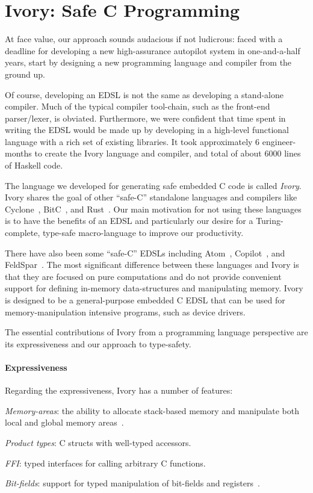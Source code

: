 \section{Ivory: Safe C Programming}
\label{sec:ivory}

At face value, our approach sounds audacious if not ludicrous: faced with a
deadline for developing a new high-assurance autopilot system in one-and-a-half
years, start by designing a new programming language and compiler from the
ground up.

Of course, developing an EDSL is not the same as developing a stand-alone
compiler.  Much of the typical compiler tool-chain, such as the front-end
parser/lexer, is obviated.  Furthermore, we were confident that time spent in
writing the EDSL would be made up by developing in a high-level functional
language with a rich set of existing libraries. It took approximately 6
engineer-months to create the Ivory language and compiler, and total of about
6000 lines of Haskell code.

The language we developed for generating safe embedded C code is called
\emph{Ivory}.  Ivory shares the goal of other ``safe-C'' standalone languages
and compilers like Cyclone~\cite{cyclone}, BitC~\cite{bitc}, and
Rust~\cite{rust}.  Our main motivation for not using these languages is to have
the benefits of an EDSL and particularly our desire for a Turing-complete,
type-safe macro-language to improve our productivity.

There have also been some ``safe-C'' EDSLs including Atom~\cite{atom},
Copilot~\cite{copilot}, and FeldSpar~\cite{feldspar1}.  The most significant
difference between these languages and Ivory is that they are focused on pure
computations and do not provide convenient support for defining in-memory
data-structures and manipulating memory.  Ivory is designed to be a
general-purpose embedded C EDSL that can be used for memory-manipulation
intensive programs, such as device drivers.

The essential contributions of Ivory from a programming language perspective are
its expressiveness and our approach to type-safety.

\paragraph{Expressiveness}
Regarding the expressiveness, Ivory has a number of features:

\begin{compactitem}
  \item \emph{Memory-areas}: the ability to allocate stack-based memory and
    manipulate both local and global memory areas~\cite{memareas}.
  \item \emph{Product types}: C structs with well-typed accessors.
  \item \emph{FFI}: typed interfaces for calling arbitrary C functions.
  \item \emph{Bit-fields}: support for typed manipulation of bit-fields and
    registers~\cite{high-level}.
\end{compactitem}

